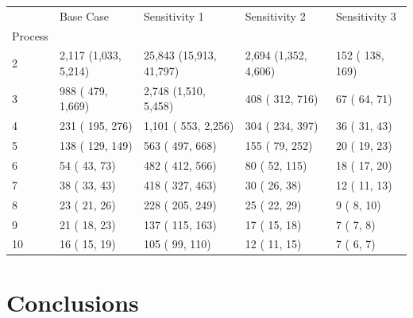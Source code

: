 \begin{table}
    \centering

    \begin{tabular}{|l|l|l|l|l|}
    \hline
     &             Base Case &            Sensitivity 1 &         Sensitivity 2 &      Sensitivity 3 \\
    Process &                       &                          &                       &                    \\
    \hline\hline
    2       &  2,117 (1,033, 5,214) &  25,843 (15,913, 41,797) &  2,694 (1,352, 4,606) &   152 ( 138,  169) \\
    3       &     988 ( 479, 1,669) &     2,748 (1,510, 5,458) &      408 ( 312,  716) &    67 (  64,   71) \\
    4       &      231 ( 195,  276) &      1,101 ( 553, 2,256) &      304 ( 234,  397) &    36 (  31,   43) \\
    5       &      138 ( 129,  149) &         563 ( 497,  668) &      155 (  79,  252) &    20 (  19,   23) \\
    6       &       54 (  43,   73) &         482 ( 412,  566) &       80 (  52,  115) &    18 (  17,   20) \\
    7       &       38 (  33,   43) &         418 ( 327,  463) &       30 (  26,   38) &    12 (  11,   13) \\
    8       &       23 (  21,   26) &         228 ( 205,  249) &       25 (  22,   29) &     9 (   8,   10) \\
    9       &       21 (  18,   23) &         137 ( 115,  163) &       17 (  15,   18) &     7 (   7,    8) \\
    10      &       16 (  15,   19) &         105 (  99,  110) &       12 (  11,   15) &     7 (   6,    7) \\
    \hline
    \end{tabular}
    \label{tab:sens_ts}
\end{table}


\section{Conclusions}\label{sec:msm_opt_conc}

